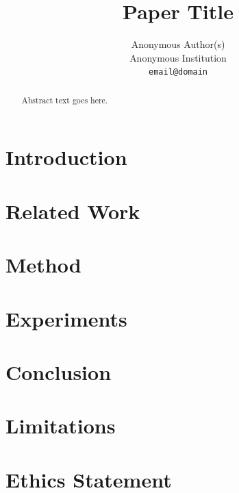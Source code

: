 \documentclass[11pt]{article}
\title{Paper Title}
\author{Anonymous Author(s) \\
Anonymous Institution \\
\texttt{email@domain} \\}
\begin{document}
\maketitle

\begin{abstract}
Abstract text goes here.
\end{abstract}

\section{Introduction}

\section{Related Work}

\section{Method}

\section{Experiments}

\section{Conclusion}

\section*{Limitations}

\section*{Ethics Statement}


\end{document}
